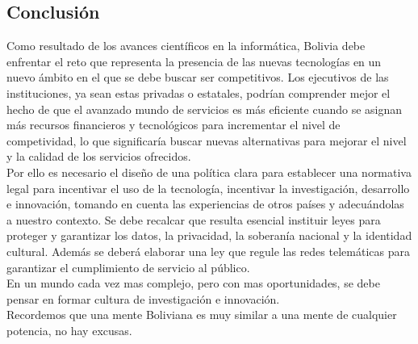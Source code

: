\documentclass[10pt]{book}
\begin{document}
\begin{multicols}{2}
\section*{Conclusión}
Como resultado de los avances científicos en la informática, Bolivia debe enfrentar el reto que representa la presencia de las nuevas tecnologías en un nuevo ámbito en el que se debe buscar ser competitivos. Los ejecutivos de las instituciones, ya sean estas privadas o estatales, podrían comprender mejor el hecho de que el avanzado mundo de servicios es más eficiente cuando se asignan más recursos financieros y tecnológicos para incrementar el nivel de competividad, lo que significaría buscar nuevas alternativas para mejorar el nivel y la calidad de los servicios ofrecidos.\\
Por ello es necesario el diseño de una política clara para establecer una normativa legal para incentivar el uso de la tecnología, incentivar la investigación, desarrollo e innovación, tomando en cuenta las experiencias de otros países y adecuándolas a nuestro contexto. Se debe recalcar que resulta esencial instituir leyes para proteger y garantizar los datos, la privacidad, la soberanía nacional y la identidad cultural. Además se deberá elaborar una ley que regule las redes telemáticas para garantizar el cumplimiento de servicio al público.\\
En un mundo cada vez mas complejo, pero con mas oportunidades, se debe pensar en formar cultura de investigación e innovación.\\ 
Recordemos que una mente Boliviana es muy similar a una mente de cualquier potencia, no hay excusas. 


\end{multicols}
\end{document}
